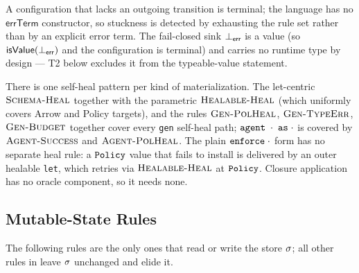 A configuration that lacks an outgoing transition is terminal; the language has no $\mathsf{errTerm}$ constructor, so stuckness is detected by exhausting the rule set rather than by an explicit error term. The fail-closed sink $\bot_{\mathsf{err}}$ is a value (so $\mathsf{isValue}(\bot_{\mathsf{err}})$ and the configuration is terminal) and carries no runtime type by design --- T2 below excludes it from the typeable-value statement.

There is one self-heal pattern per kind of materialization. The let-centric
$\textsc{Schema-Heal}$ together with the parametric $\textsc{Healable-Heal}$
(which uniformly covers Arrow and Policy targets), and the rules
\allowbreak$\textsc{Gen-PolHeal}$, \allowbreak$\textsc{Gen-TypeErr}$,
\allowbreak$\textsc{Gen-Budget}$ together cover every \texttt{gen} self-heal
path; $\texttt{agent}\;\cdot\;\texttt{as}\;\cdot$ is covered by $\textsc{Agent-Success}$ and
\allowbreak$\textsc{Agent-PolHeal}$. The plain $\texttt{enforce}\;\cdot$ form has no
separate heal rule: a $\texttt{Policy}$ value that fails to install is delivered by an
outer healable \texttt{let}, which retries via $\textsc{Healable-Heal}$ at
$\texttt{Policy}$. Closure application has no oracle component, so it needs none.

\subsection{Mutable-State Rules}
\label{app:rules-mut}

The following rules are the only ones that read or write the store $\sigma$; all other rules in  leave $\sigma$ unchanged and elide it.

